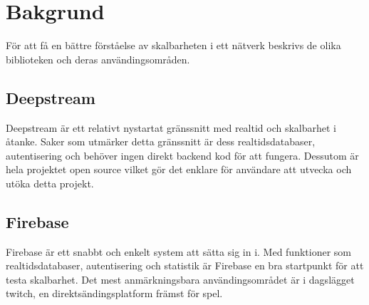 \section{Bakgrund}
\label{sec:tim-background}
För att få en bättre förståelse av skalbarheten i ett nätverk beskrivs de olika biblioteken och deras användingsområden.

\subsection{Deepstream}
Deepstream är ett relativt nystartat gränssnitt med realtid och skalbarhet i åtanke. Saker som utmärker detta gränssnitt är dess realtidsdatabaser, autentisering och behöver ingen direkt backend kod för att fungera. Dessutom är hela projektet open source vilket gör det enklare för användare att utvecka och utöka detta projekt. 

\subsection{Firebase}
Firebase är ett snabbt och enkelt system att sätta sig in i. Med funktioner som realtidsdatabaser, autentisering och statistik är Firebase en bra startpunkt för att testa skalbarhet. Det mest anmärkningsbara användingsområdet är i dagslägget twitch, en direktsändingsplatform främst för spel.
